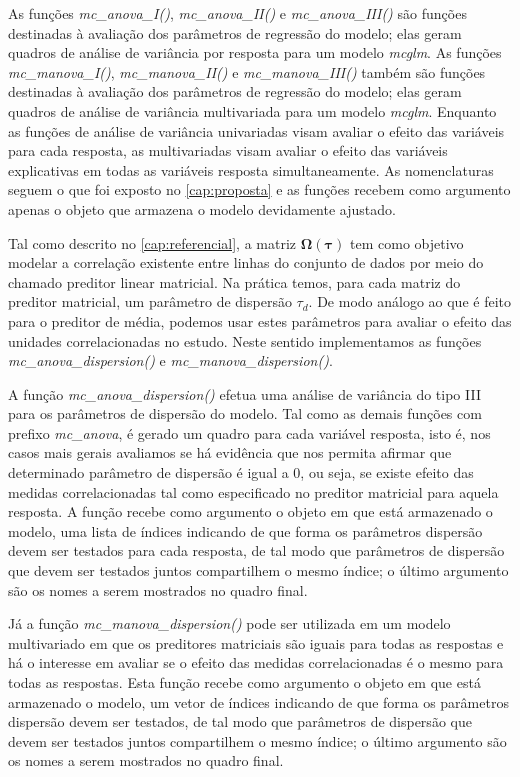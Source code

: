 As funções \emph{mc\_anova\_I()}, \emph{mc\_anova\_II()} e \emph{mc\_anova\_III()} são funções destinadas à avaliação dos parâmetros de regressão do modelo; elas geram quadros de análise de variância por resposta para um modelo \emph{mcglm}. As funções \emph{mc\_manova\_I()}, \emph{mc\_manova\_II()} e \emph{mc\_manova\_III()} também são funções destinadas à avaliação dos parâmetros de regressão do modelo; elas geram quadros de análise de variância multivariada para um modelo \emph{mcglm}. Enquanto as funções de análise de variância univariadas visam avaliar o efeito das variáveis para cada resposta, as multivariadas visam avaliar o efeito das variáveis explicativas em todas as variáveis resposta simultaneamente. As nomenclaturas seguem o que foi exposto no \autoref{cap:proposta} e as funções recebem como argumento apenas o objeto que armazena o modelo devidamente ajustado.

Tal como descrito no \autoref{cap:referencial}, a matriz $\boldsymbol{\Omega({\tau})}$ tem como objetivo modelar a correlação existente entre linhas do conjunto de dados por meio do chamado preditor linear matricial. Na prática temos, para cada matriz do preditor matricial, um parâmetro de dispersão $\tau_d$. De modo análogo ao que é feito para o preditor de média, podemos usar estes parâmetros para avaliar o efeito das unidades correlacionadas no estudo. Neste sentido implementamos as funções \emph{mc\_anova\_dispersion()} e \emph{mc\_manova\_dispersion()}. 

A função \emph{mc\_anova\_dispersion()} efetua uma análise de variância do tipo III para os parâmetros de dispersão do modelo. Tal como as demais funções com prefixo \emph{mc\_anova}, é gerado um quadro para cada variável resposta, isto é, nos casos mais gerais avaliamos se há evidência que nos permita afirmar que determinado parâmetro de dispersão é igual a 0, ou seja, se existe efeito das medidas correlacionadas tal como especificado no preditor matricial para aquela resposta. A função recebe como argumento o objeto em que está armazenado o modelo, uma lista de índices indicando de que forma os parâmetros dispersão devem ser testados para cada resposta, de tal modo que parâmetros de dispersão que devem ser testados juntos compartilhem o mesmo índice; o último argumento são os nomes a serem mostrados no quadro final.

Já a função \emph{mc\_manova\_dispersion()} pode ser utilizada em um modelo multivariado em que os preditores matriciais são iguais para todas as respostas e há o interesse em avaliar se o efeito das medidas correlacionadas é o mesmo para todas as respostas. Esta função recebe como argumento o objeto em que está armazenado o modelo, um vetor de índices indicando de que forma os parâmetros dispersão devem ser testados, de tal modo que parâmetros de dispersão que devem ser testados juntos compartilhem o mesmo índice; o último argumento são os nomes a serem mostrados no quadro final.


